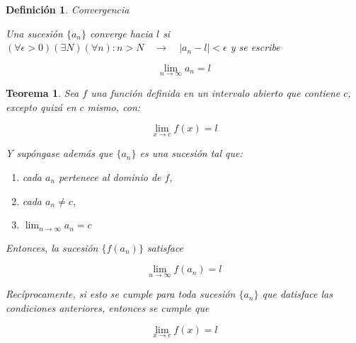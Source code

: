 \documentclass[12pt,a4paper]{article}
\newtheorem{mydef}{Definici\'on}[section]
\newtheorem{theorem}{Teorema}[section]
\begin{document}
\begin{mydef}{Convergencia}

Una sucesi\'on \( \{ a_n \} \) \emph{converge hacia \( l \)} si  \(
(\forall \epsilon > 0) (\exists N) (\forall n)  :   n > N
\quad \to \quad | a_n - l | < \epsilon \) y se escribe 

\[ \lim_{n \to \infty} a_n = l \]


\end{mydef}


\begin{theorem}
Sea \( f \) una funci\'on definida en un intervalo abierto que contiene
\( c \), excepto quiz\'a en \( c \) mismo, con:

\[ \lim_{x \to c} f(x) = l \]

Y sup\'ongase adem\'as que \( \{ a_n \} \) es una sucesi\'on tal que:
\begin{enumerate}
\item cada \( a_n \) pertenece al dominio de \( f \),
\item cada \( a_n \neq c \),
\item \(\lim_{n \to \infty} a_n = c\)
\end{enumerate}

Entonces, la sucesi\'on \( \{ f(a_n) \} \) satisface

\[ \lim_{n \to \infty} f(a_n) = l\]

Rec\'iprocamente, si esto se cumple para toda sucesi\'on \( \{ a_n \}
\) que datisface las condiciones anteriores, entonces se cumple que

\[ \lim_{x \to c} f(x) = l \]


\end{theorem}
\end{document}
